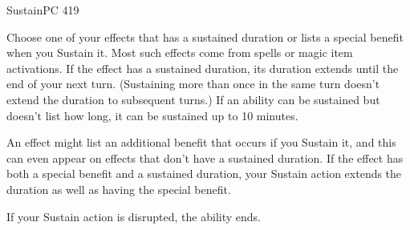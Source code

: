 \documentclass[12pt,openany,twocolumn]{book}
\begin{document}
\begin{action}{Sustain}{}{PC 419}
    \begin{actioninfo}
    \end{actioninfo}

    \begin{actionbody}
        Choose one of your effects that has a sustained duration or lists a special benefit when you Sustain it. Most such effects come from spells or magic item activations. If the effect has a sustained duration, its duration extends until the end of your next turn. (Sustaining more than once in the same turn doesn't extend the duration to subsequent turns.) If an ability can be sustained but doesn't list how long, it can be sustained up to 10 minutes.

        An effect might list an additional benefit that occurs if you Sustain it, and this can even appear on effects that don't have a sustained duration. If the effect has both a special benefit and a sustained duration, your Sustain action extends the duration as well as having the special benefit.

        If your Sustain action is disrupted, the ability ends.
    \end{actionbody}
\end{action}
\end{document}
